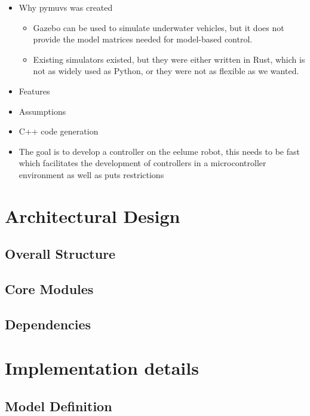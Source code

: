 \begin{itemize}
\item Why pymuvs was created
    \begin{itemize}
    \item Gazebo can be used to simulate underwater vehicles, but it does not provide
    the model matrices needed for model-based control.
    \item Existing simulators existed, but they were either written in Rust, which
    is not as widely used as Python, or they were not as flexible as we wanted.
    \end{itemize}
\item Features
\item Assumptions
\item C++ code generation
\item The goal is to develop a controller on the eelume robot, this needs to be fast
which facilitates the development of controllers in a microcontroller environment
as well as puts restrictions
\end{itemize}

\section{Architectural Design}

\subsection{Overall Structure}

\subsection{Core Modules}

\subsection{Dependencies}

\section{Implementation details}

\subsection{Model Definition}

